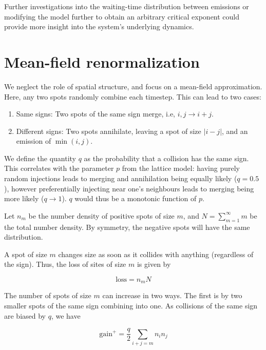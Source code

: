 \documentclass[aps, pre, reprint]{revtex4-2}
\begin{document}
Further investigations into the waiting-time distribution between emissions or modifying the model further to obtain an arbitrary critical exponent could provide more insight into the system's underlying dynamics.





\clearpage

\appendix

\section{Mean-field renormalization}

We neglect the role of spatial structure, and focus on a mean-field approximation. Here, any two spots randomly combine each timestep. This can lead to two cases:
\begin{enumerate}
    \item Same signs: Two spots of the same sign merge, i.e, $i,j\to i+j$.
    \item Different signs: Two spots annihilate, leaving a spot of size $\lvert i-j\rvert$, and an emission of $\min(i,j)$.
\end{enumerate}
We define the quantity $q$ as the probability that a collision has the same sign. 
This correlates with the parameter $p$ from the lattice model: having purely random injections leads to merging and annihilation being equally likely ($q\!=\!0.5$), however preferentially injecting near one's neighbours leads to merging being more likely ($q\!\to\!1$). $q$ would thus be a monotonic function of $p$.

Let $n_m$ be the number density of positive spots of size $m$, and $N=\sum_{m=1}^\infty m$ be the total number density. By symmetry, the negative spots will have the same distribution.

A spot of size $m$ changes size as soon as it collides with anything (regardless of the sign). Thus, the loss of sites of size $m$ is given by

\begin{equation}
    \textrm{loss} = n_m N
\end{equation}

The number of spots of size $m$ can increase in two ways. The first is by two smaller spots of the same sign combining into one. As collisions of the same sign are biased by $q$, we have

\begin{equation}
    \textrm{gain}^+ = \frac{q}2 \sum_{i+j=m} n_i n_j
\end{equation}
\end{document}
